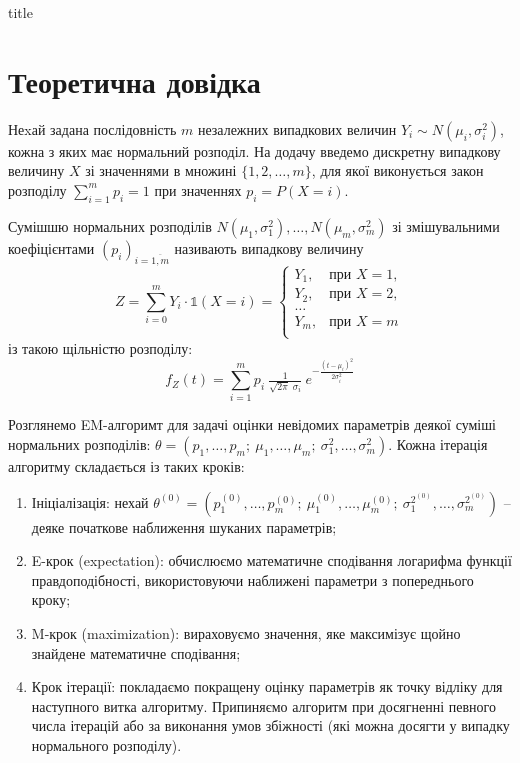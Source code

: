 \documentclass[a4paper,14pt]{extarticle} %
\numberwithin{equation}{section}
\begin{document}
{title}

\section*{Теоретична довідка}

Неxай задана послідовність $m$ незалежних випадкових величин $Y_i \sim N(\mu_i, \sigma_i^2)$, кожна з яких має нормальний розподіл. На додачу введемо дискретну випадкову величину $X$ зі значеннями в множині 
$\{ 1,2,\ldots,m \}$, для якої виконується закон розподілу 
$\sum\limits_{i=1}^m p_i = 1$ при значеннях $p_i=P(X=i)$. 

Сумішшю нормальних розподілів $N(\mu_1, \sigma_1^2), \ldots, N(\mu_m, \sigma_m^2)$ зі змішувальними коефіцієнтами 
$(p_i)_{i=\overline{1,m}}$ називають випадкову величину
\[ Z=\sum\limits_{i=0}^{m}Y_i\cdot \mathds{1}(X=i) = \begin{cases}
    Y_1, &\text{при } X=1, \\
    Y_2, &\text{при } X=2, \\
    \ldots \\
    Y_m, &\text{при } X=m \\
\end{cases}\]
із такою щільністю розподілу:
\[ f_Z(t)=\sum\limits_{i=1}^m p_i\ \tfrac{1}{\sqrt{2\pi}\; \sigma_i}\ e^{-\tfrac{(t-\mu_i)^2}{2\sigma_i^2}} \]

Розглянемо EM-алгоримт для задачі оцінки невідомих параметрів деякої суміші нормальних розподілів:
$\theta=(p_1,\ldots, p_m;\ \mu_1,\ldots, \mu_m;\ \sigma_1^2,\ldots, \sigma_m^2)$. Кожна ітерація алгоритму складається із таких кроків:
\begin{enumerate} [(1)]
    \item Ініціалізація: нехай 
    $\theta^{(0)}=(p_1^{(0)},\ldots, p_m^{(0)};\ \mu_1^{(0)},\ldots, \mu_m^{(0)};\ \sigma_1^{2^{(0)}},\ldots, \sigma_m^{2^{(0)}})$ 
    -- деяке початкове наближення шуканих параметрів;
    \item E-крок (expectation): обчислюємо математичне сподівання логарифма функції правдоподібності, використовуючи наближені параметри з попереднього кроку;
    \item M-крок (maximization): вираховуємо значення, яке максимізує щойно знайдене математичне сподівання; 
    \item Крок ітерації: покладаємо покращену оцінку параметрів як точку відліку для наступного витка алгоритму. Припиняємо алгоритм при досягненні певного числа ітерацій або за виконання умов збіжності (які можна досягти у випадку нормального розподілу). 
\end{enumerate}
\end{document}
